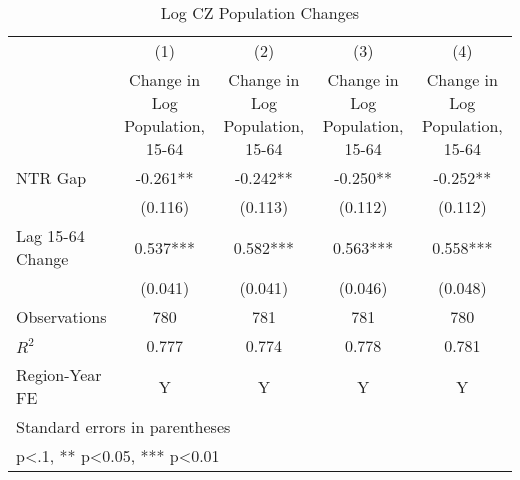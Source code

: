 \begin{table}[htbp]\centering
\def\sym#1{\ifmmode^{#1}\else\(^{#1}\)\fi}
\caption{Log CZ Population Changes}
\begin{tabular}{l*{4}{c}}
\toprule
                    &\multicolumn{1}{c}{(1)}&\multicolumn{1}{c}{(2)}&\multicolumn{1}{c}{(3)}&\multicolumn{1}{c}{(4)}\\
                    &\multicolumn{1}{c}{Change in Log Population, 15-64}&\multicolumn{1}{c}{Change in Log Population, 15-64}&\multicolumn{1}{c}{Change in Log Population, 15-64}&\multicolumn{1}{c}{Change in Log Population, 15-64}\\
\midrule
NTR Gap             &   -0.261** &   -0.242** &   -0.250** &   -0.252** \\
                    &  (0.116)   &  (0.113)   &  (0.112)   &  (0.112)   \\
\addlinespace
Lag 15-64 Change    &    0.537***&    0.582***&    0.563***&    0.558***\\
                    &  (0.041)   &  (0.041)   &  (0.046)   &  (0.048)   \\
\midrule
Observations        &      780   &      781   &      781   &      780   \\
\(R^{2}\)           &    0.777   &    0.774   &    0.778   &    0.781   \\
Region-Year FE      &        Y   &        Y   &        Y   &        Y   \\
\bottomrule
\multicolumn{5}{l}{\footnotesize Standard errors in parentheses}\\
\multicolumn{5}{l}{\footnotesize * p<.1, ** p<0.05, *** p<0.01}\\
\end{tabular}
\end{table}
